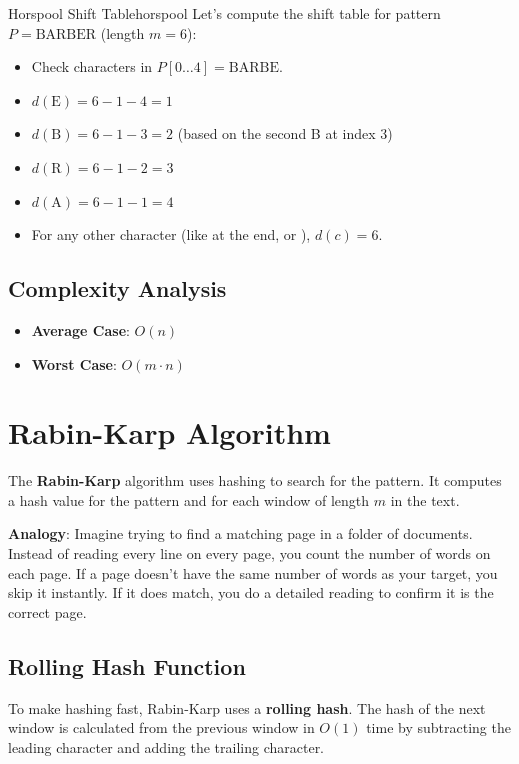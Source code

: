 \documentclass[11pt,a4paper]{article}
\begin{document}
\begin{example}{Horspool Shift Table}{horspool}
  Let's compute the shift table for pattern $P = \text{BARBER}$ (length $m = 6$):
  \begin{itemize}
    \item Check characters in $P[0 \dots 4] = \text{BARBE}$.
    \item $d(\text{E}) = 6 - 1 - 4 = 1$
    \item $d(\text{B}) = 6 - 1 - 3 = 2$ (based on the second B at index 3)
    \item $d(\text{R}) = 6 - 1 - 2 = 3$
    \item $d(\text{A}) = 6 - 1 - 1 = 4$
    \item For any other character (like  at the end, or ), $d(c) = 6$.
  \end{itemize}
\end{example}

\subsection{Complexity Analysis}
\begin{itemize}
  \item \textbf{Average Case}: $O(n)$
  \item \textbf{Worst Case}: $O(m \cdot n)$
\end{itemize}

\section{Rabin-Karp Algorithm}

The \textbf{Rabin-Karp} algorithm uses hashing to search for the pattern. It computes a hash value for the pattern and for each window of length $m$ in the text.

\begin{notebox}
  \textbf{Analogy}:
  Imagine trying to find a matching page in a folder of documents. Instead of reading every line on every page, you count the number of words on each page. If a page doesn't have the same number of words as your target, you skip it instantly. If it does match, you do a detailed reading to confirm it is the correct page.
\end{notebox}

\subsection{Rolling Hash Function}
To make hashing fast, Rabin-Karp uses a \textbf{rolling hash}. The hash of the next window is calculated from the previous window in $O(1)$ time by subtracting the leading character and adding the trailing character.
\end{document}
